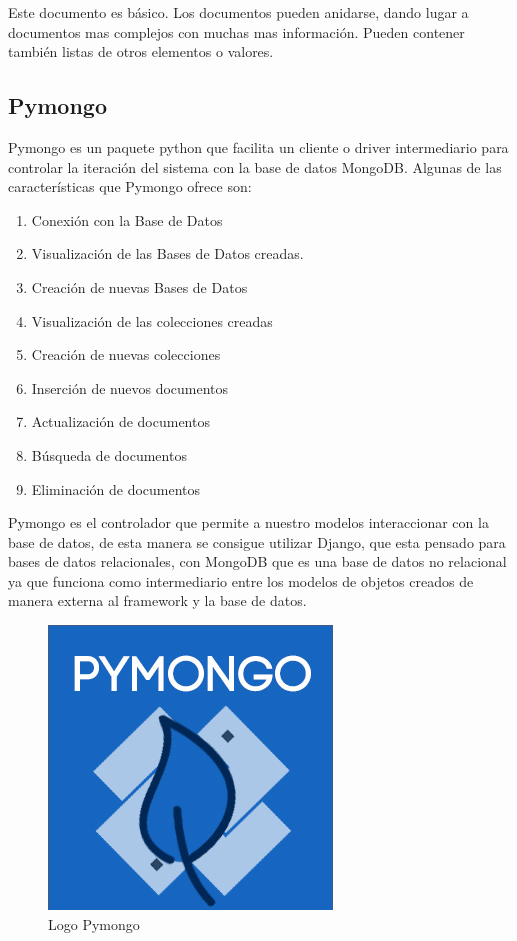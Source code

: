 \documentclass[a4paper,11pt]{book}
\begin{document}
Este documento es básico. Los documentos pueden anidarse, dando lugar a documentos mas complejos con muchas mas información. Pueden contener también listas de otros elementos o valores. 

\subsection{Pymongo} 
Pymongo\cite{pymongo} es un paquete python que facilita un cliente o driver intermediario para controlar la iteración del sistema con la base de datos MongoDB. Algunas de las características que Pymongo ofrece son:

\begin{enumerate}
\item Conexión con la Base de Datos
\item Visualización de las Bases de Datos creadas.
\item Creación de nuevas Bases de Datos
\item Visualización de las colecciones creadas
\item Creación de nuevas colecciones
\item Inserción de nuevos documentos
\item Actualización de documentos
\item Búsqueda de documentos
\item Eliminación de documentos
\end{enumerate}

Pymongo es el controlador que permite a nuestro modelos interaccionar con la base de datos, de esta manera se consigue utilizar Django, que esta pensado para bases de datos relacionales, con MongoDB que es una base de datos no relacional ya que funciona como intermediario entre los modelos de objetos creados de manera externa al framework y la base de datos.

\begin{figure}[H] 
\centering 
\includegraphics[scale=0.25]{imagenes/desarrollo_herramienta/pymongo.jpg}
\caption{ Logo Pymongo\cite{pymongoL}}  
\end{figure} 
\end{document}
